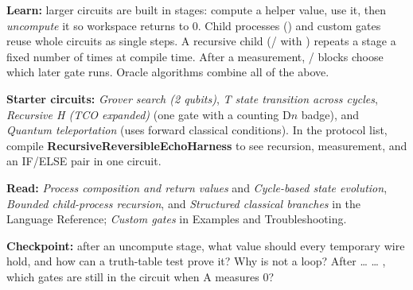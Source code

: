 \textbf{Learn:} larger circuits are built in stages: compute a helper value,
use it, then \emph{uncompute} it so workspace returns to 0. Child processes
() and custom gates reuse whole circuits as single steps.
A recursive child (/ with ) repeats a
stage a fixed number of times at compile time. After a measurement,
/ blocks choose which later gate runs. Oracle algorithms
combine all of the above.

\textbf{Starter circuits:} \emph{Grover search (2 qubits)},
\emph{T state transition across cycles},
\emph{Recursive H (TCO expanded)} (one gate with a counting D$n$ badge), and
\emph{Quantum teleportation} (uses forward classical  conditions).
In the protocol list, compile \textbf{RecursiveReversibleEchoHarness} to see
recursion, measurement, and an IF/ELSE pair in one circuit.

\textbf{Read:} \emph{Process composition and return values} and
\emph{Cycle-based state evolution}, \emph{Bounded child-process recursion},
and \emph{Structured classical branches} in the Language Reference;
\emph{Custom gates} in Examples and Troubleshooting.

\textbf{Checkpoint:} after an uncompute stage, what value should every
temporary wire hold, and how can a truth-table test prove it?
Why is  not a loop? After  \ldots{}
 \ldots{} , which gates are still in the circuit when
A measures 0?